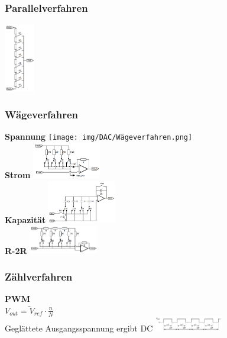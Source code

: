 \documentclass[margin=normal]{tex/hsrzf}
\begin{document}
\begin{multicols}{5}


  \subsubsection*{Parallelverfahren}
  \includegraphics[height = 3cm]{img/DAC/Parallelverfahren.png}

  \subsubsection*{Wägeverfahren}
  \scriptsize
  \textbf{Spannung}
  \texttt{[image: img/DAC/Wägeverfahren.png]}
  \\\textbf{Strom}
  \includegraphics[width = 3cm]{img/DAC/Wägeverfahren_Ströme.png}
  \\\textbf{Kapazität}
  \includegraphics[width = 3cm]{img/DAC/C-DAC.png}
  \\\textbf{R-2R}
  \includegraphics[width = 3cm]{img/DAC/R-2R-DAC.png}

  \subsubsection*{Zählverfahren}
  \scriptsize
  \textbf{PWM} \\
  \tiny{
    $\bar{V_{out} = V_{ref} \cdot \frac{n}{N}}$
    \\ Geglättete Ausgangsspannung ergibt DC}
  \includegraphics[width = 3cm]{img/DAC/PWM.png}

\end{multicols}
\end{document}
